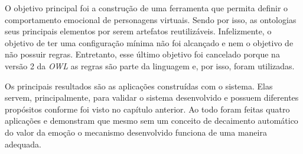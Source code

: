 O objetivo principal foi a construção de uma ferramenta que permita definir o
comportamento emocional de personagens virtuais. Sendo por isso, as ontologias
seus principais elementos por serem artefatos reutilizáveis. Infelizmente, o
objetivo de ter uma configuração mínima não foi alcançado e nem o objetivo de
não possuir regras. Entretanto, esse último objetivo foi cancelado
porque na versão 2 da \emph{OWL} as regras são parte da linguagem
e, por isso, foram utilizadas.

Os principais resultados são as aplicações construídas com o sistema. Elas
servem, principalmente, para validar o sistema desenvolvido e possuem
diferentes propósitos conforme foi visto no capítulo anterior. Ao todo foram
feitas quatro aplicações e demonstram que mesmo sem um conceito de decaimento
automático do valor da emoção o mecanismo desenvolvido funciona de uma maneira
adequada.

